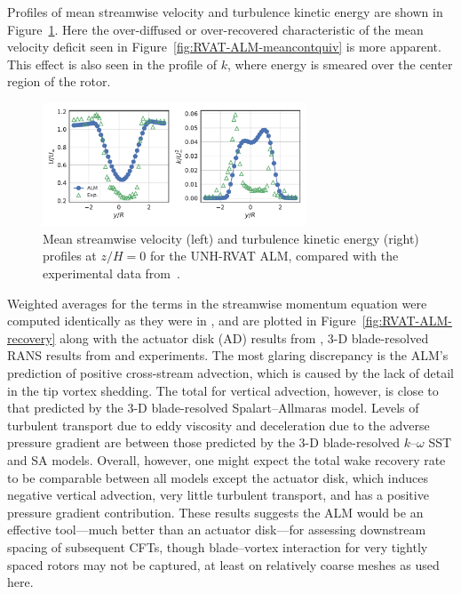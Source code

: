 \documentclass[times]{weauth}
\begin{document}
Profiles of mean streamwise velocity and turbulence kinetic energy are shown in
Figure~\ref{fig:RVAT-ALM-profiles}. Here the over-diffused or over-recovered
characteristic of the mean velocity deficit seen in
Figure~\ref{fig:RVAT-ALM-meancontquiv} is more apparent. This effect is also
seen in the profile of $k$, where energy is smeared over the center region of
the rotor.

\begin{figure}
    \centering

    \includegraphics[width=0.7\textwidth]{RVAT-ALM_wake-profiles}

    \caption{Mean streamwise velocity (left) and turbulence kinetic energy
        (right) profiles at $z/H=0$ for the UNH-RVAT ALM, compared with the
        experimental data from~\cite{Bachant2016-RVAT-Re-dep}.}

    \label{fig:RVAT-ALM-profiles}
\end{figure}

Weighted averages for the terms in the streamwise momentum equation were
computed identically as they were in \cite{Bachant2015-JoT,Bachant2016-BR-CFD},
and are plotted in Figure~\ref{fig:RVAT-ALM-recovery} along with the actuator
disk (AD) results from \cite{Bachant2015-JoT}, 3-D blade-resolved RANS results
from \cite{Bachant2016-BR-CFD} and experiments. The most glaring discrepancy is
the ALM's prediction of positive cross-stream advection, which is caused by the
lack of detail in the tip vortex shedding. The total for vertical advection,
however, is close to that predicted by the 3-D blade-resolved Spalart--Allmaras
model. Levels of turbulent transport due to eddy viscosity and deceleration due
to the adverse pressure gradient are between those predicted by the 3-D
blade-resolved $k$--$\omega$ SST and SA models. Overall, however, one might
expect the total wake recovery rate to be comparable between all models except
the actuator disk, which induces negative vertical advection, very little
turbulent transport, and has a positive pressure gradient contribution. These
results suggests the ALM would be an effective tool---much better than an
actuator disk---for assessing downstream spacing of subsequent CFTs, though
blade--vortex interaction for very tightly spaced rotors may not be captured, at
least on relatively coarse meshes as used here.
\end{document}
